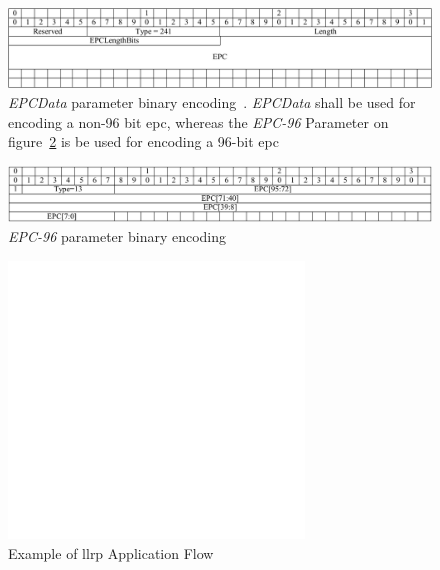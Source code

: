 \begin{figure}[]
    \centering
    \includegraphics[width=\textwidth]{./figs/02-state-of-the-art/EPCDataParameter_bin.pdf}
    \caption{\textit{EPCData} parameter binary encoding~\cite{LowLevelReader}. \textit{EPCData} shall be used for encoding a non-96 bit \ac{epc}, whereas the \textit{EPC-96} Parameter on figure~\ref{fig:EPC96bin} is be used for encoding a 96-bit \ac{epc}} 
    \label{fig:EPCDatabin}
\end{figure}

\begin{figure}[]
    \centering
    \includegraphics[width=\textwidth]{./figs/02-state-of-the-art/EPC96ParameterTVEncoding_bin.pdf}
    \caption{\textit{EPC-96} parameter binary encoding~\cite{LowLevelReader}} 
    \label{fig:EPC96bin}
\end{figure}

\begin{figure}[!ht]
    \centering
    \includegraphics[width=0.7\textwidth]{./figs/02-state-of-the-art/llrpflow.pdf}
    \caption{Example of \ac{llrp} Application Flow~\cite{ImpinjLTKProgrammers}} 
    \label{fig:llrpflow}
\end{figure}

